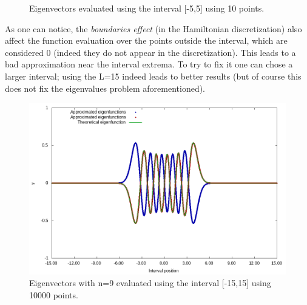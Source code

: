 \documentclass[12pt, a4paper, notitlepage]{report}
\begin{document}
\begin{figure}[h!]
	\label{L5k10}
	\caption{Eigenvectors evaluated using the interval [-5,5] using 10 points.}
\end{figure}

As one can notice, the \textit{boundaries effect} (in the Hamiltonian discretization) also affect the function evaluation over the points outside the interval, which are considered 0 (indeed they do not appear in the discretization). This leads to a bad approximation near the interval extrema. To try to fix it one can chose a larger interval; using the L=15 indeed leads to better results (but of course this does not fix the eigenvalues problem aforementioned).

\begin{figure}[h!]
	\centering
	\includegraphics[scale=0.5]{./Res_L15_k10000/eigf9_L15,0_k10000.png}
	\caption{Eigenvectors with n=9 evaluated using the interval [-15,15] using 10000 points.}
\end{figure}
\end{document}
